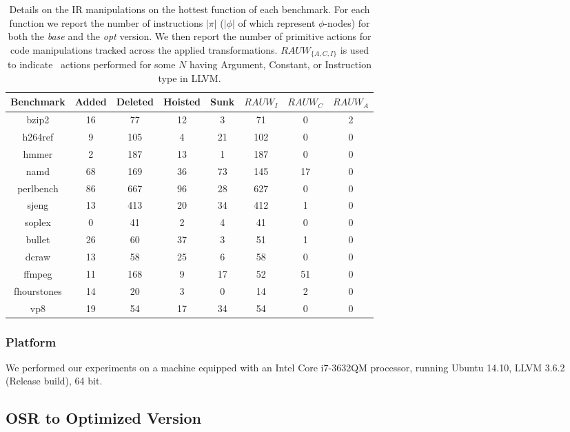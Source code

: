 \begin{table}[!t]
\begin{center}
\begin{small}
\begin{tabular}{|c|c|c|c|c|c|c|c|}
\hline
Benchmark & Added & Deleted & Hoisted & Sunk & $RAUW_I$ & $RAUW_C$ & $RAUW_A$ \\
\hline
\hline
bzip2 & 16 & 77 & 12 & 3 & 71 & 0 & 2 \\
\hline
h264ref & 9 & 105 & 4 & 21 & 102 & 0 & 0 \\
\hline
hmmer & 2 & 187 & 13 & 1 & 187 & 0 & 0 \\
\hline
namd & 68 & 169 & 36 & 73 & 145 & 17 & 0 \\
\hline
perlbench & 86 & 667 & 96 & 28 & 627 & 0 & 0 \\
\hline
sjeng & 13 & 413 & 20 & 34 & 412 & 1 & 0 \\
\hline
soplex & 0 & 41 & 2 & 4 & 41 & 0 & 0 \\
\hline
bullet & 26 & 60 & 37 & 3 & 51 & 1 & 0 \\
\hline
dcraw & 13 & 58 & 25 & 6 & 58 & 0 & 0 \\
\hline
ffmpeg & 11 & 168 & 9 & 17 & 52 & 51 & 0 \\
\hline
fhourstones & 14 & 20 & 3 & 0 & 14 & 2 & 0 \\
\hline
vp8 & 19 & 54 & 17 & 34 & 54 & 0 & 0 \\
\hline
\end{tabular}
\end{small}
\end{center}
\caption{\label{tab:OSR-alC-bench-IR} Details on the IR manipulations on the hottest function of each benchmark. For each function we report the number of instructions $|\pi|$ ($|\phi|$ of which represent $\phi$-nodes) for both the {\em base} and the {\em opt} version. We then report the number of primitive actions for code manipulations tracked across the applied transformations. $RAUW_{\{A,C,I\}}$ is used to indicate \RAUWfull\ actions performed for some {$N$} having Argument, Constant, or Instruction type in LLVM.
}
\end{table}

\subsubsection*{Platform}
We performed our experiments on a machine equipped with an Intel Core i7-3632QM processor, running Ubuntu 14.10, LLVM 3.6.2 (Release build), 64 bit.

\subsection{OSR to Optimized Version}

